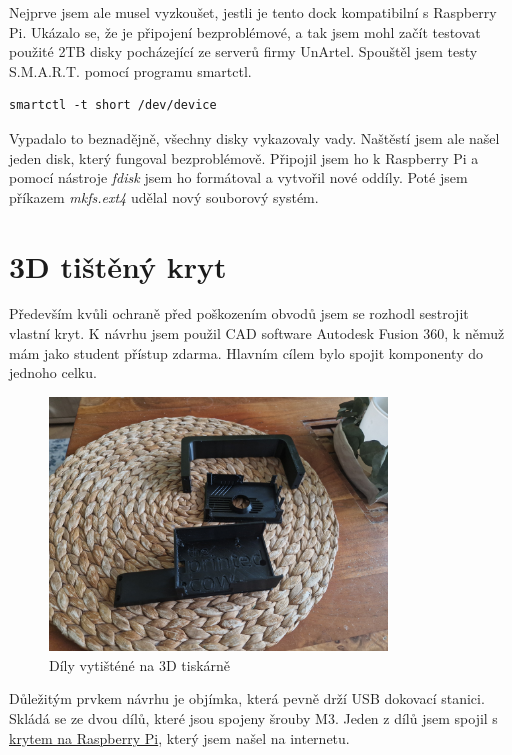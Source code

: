 \documentclass[a4paper,12pt, oneside]{book}
\begin{document}
Nejprve jsem ale musel vyzkoušet, jestli je tento dock kompatibilní 
s Raspberry Pi. Ukázalo se, že je připojení bezproblémové, a tak
jsem mohl začít testovat použité 2TB disky pocházející ze serverů
firmy UnArtel. Spouštěl jsem testy S.M.A.R.T. pomocí programu smartctl.

\begin{lstlisting}
smartctl -t short /dev/device
\end{lstlisting} 

Vypadalo to beznadějně, všechny disky vykazovaly vady. 
Naštěstí jsem ale našel jeden disk, který fungoval bezproblémově.
Připojil jsem ho k Raspberry Pi a pomocí nástroje
\emph{fdisk} jsem ho formátoval a vytvořil nové oddíly.
Poté jsem příkazem \emph{mkfs.ext4} udělal nový souborový systém.


\newpage


\section{3D tištěný kryt}

Především kvůli ochraně před poškozením obvodů jsem se rozhodl 
sestrojit vlastní kryt. K návrhu jsem použil CAD software 
Autodesk Fusion 360, k němuž mám jako student přístup zdarma.
Hlavním cílem bylo spojit komponenty do jednoho celku.


\begin{figure}[h]
\centering
\includegraphics[width=0.8\textwidth]{img/dily-zvlast.jpg}
\caption{Díly vytišténé na 3D tiskárně}
\end{figure}

Důležitým prvkem návrhu je objímka, která pevně drží USB dokovací stanici.
Skládá se ze dvou dílů, které jsou spojeny šrouby M3. Jeden z dílů jsem
spojil s
\href{https://www.printables.com/model/705427-retro-raspberry-pi-5-case-snap-fit}{krytem
na Raspberry Pi}, který jsem našel na internetu.
\end{document}
